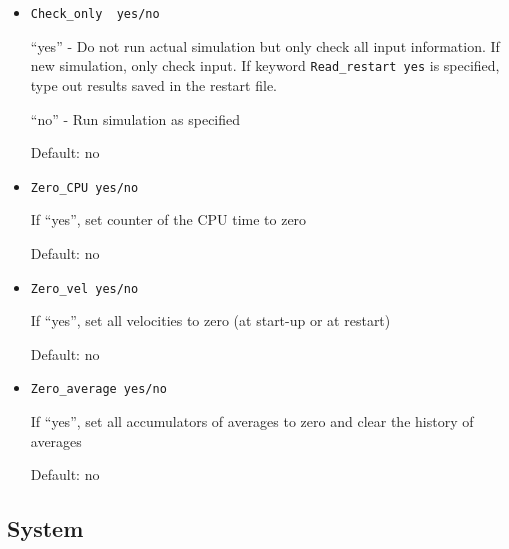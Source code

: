 \documentclass{article}
\begin{document}
\begin{itemize}
If \verb|Change_V| option is set to ``slow'', the program 
starts with the box size specified in the restart file or 
in the ``.start'' file with initial structure. Then, during 
\verb|num| steps, the box sizes are gradually transformed to 
the values given by  \verb|Box| or \verb|Density| keyword.
This option is not compatible with constant-pressure 
simulations.

In all cases when the box sizes are changed, all the distances 
between the molecules are rescaled by the corresponding factor.

Default: no

\item
\verb|Check_only  yes/no|

``yes'' - Do not run actual simulation but only check all input 
information. If new simulation, only check input. If keyword 
\verb|Read_restart yes| is specified, type out results saved in the 
restart file.
 
``no''  - Run simulation as specified

Default: no

\item
\verb|Zero_CPU yes/no|

If ``yes'', set counter of the CPU time to zero

Default: no

\item
\verb|Zero_vel yes/no|

If ``yes'', set all velocities to zero (at start-up or at restart)

Default: no

\item
\verb|Zero_average yes/no|

If ``yes'', set all accumulators of averages to zero and clear the history
of averages

Default: no

\end{itemize}

\subsection{System}
\end{document}
